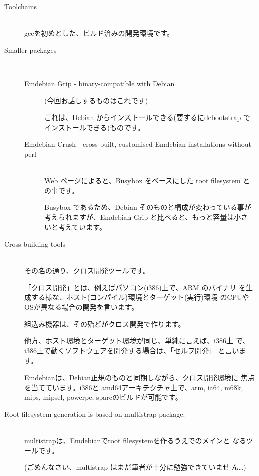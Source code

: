 \documentclass[mingoth,a4paper]{jsarticle}
\begin{document}
\begin{description}
 \item[Toolchains]\mbox{}\\ 
           gccを初めとした、ビルド済みの開発環境です。
 \item[Smaller packages]\mbox{}\\
  \begin{description}
   \item[Emdebian Grip - binary-compatible with Debian](今回お話しするものはこれです)

              これは、Debian からインストールできる(要するにdebootstrap でインストールできる)ものです。
   \item[Emdebian Crush - cross-built, customised Emdebian installations without perl]\mbox{}\\
              Web ページによると、Busybox をベースにした root filesystem
              との事です。

              Busybox であるため、Debian そのものと構成が変わっている事が
              考えられますが、Emdebian Grip と比べると、もっと容量は小さ
              いと考えています。
  \end{description}

 \item[Cross building tools]\mbox{}\\
            その名の通り、クロス開発ツールです。

            「クロス開発」とは、例えばパソコン(i386)上で、ARM のバイナリ
            を生成する様な、ホスト(コンパイル)環境とターゲット(実行)環境
            のCPUやOSが異なる場合の開発を言います。

            組込み機器は、その殆どがクロス開発で作ります。

            他方、ホスト環境とターゲット環境が同じ、単純に言えば、i386上
            で、i386上で動くソフトウェアを開発する場合は、「セルフ開発」
            と言います。

            Emdebianは、Debian正規のものと同期しながら、クロス開発環境に
            焦点を当てています。i386と amd64アーキテクチャ上で、arm,
            ia64, m68k, mips, mipsel, powerpc, sparcのビルドが可能です。
 \item[Root filesystem generation is based on multistrap package.]\mbox{}\\
            multistrapは、Emdebianでroot filesystemを作るうえでのメインと
            なるツールです。

            (ごめんなさい、multistrap はまだ筆者が十分に勉強できていませ
            ん…)
\end{description}
\end{document}
